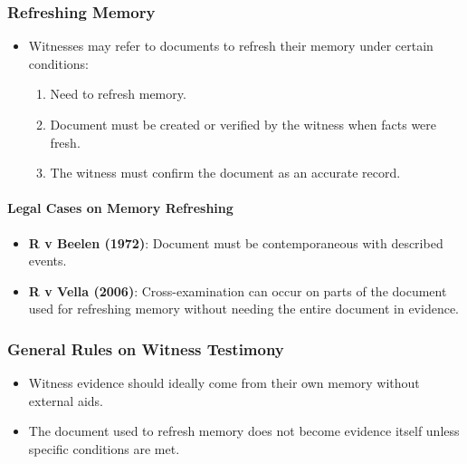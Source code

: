 \subsubsection{Refreshing Memory}\label{refreshing-memory}

\begin{itemize}
\tightlist
\item
  Witnesses may refer to documents to refresh their memory under certain
  conditions:

  \begin{enumerate}
  \def\labelenumi{\arabic{enumi}.}
  \tightlist
  \item
    Need to refresh memory.
  \item
    Document must be created or verified by the witness when facts were
    fresh.
  \item
    The witness must confirm the document as an accurate record.
  \end{enumerate}
\end{itemize}

\paragraph{Legal Cases on Memory
Refreshing}\label{legal-cases-on-memory-refreshing}

\begin{itemize}
\tightlist
\item
  \textbf{R v Beelen (1972)}: Document must be contemporaneous with
  described events.
\item
  \textbf{R v Vella (2006)}: Cross-examination can occur on parts of the
  document used for refreshing memory without needing the entire
  document in evidence.
\end{itemize}

\subsubsection{General Rules on Witness
Testimony}\label{general-rules-on-witness-testimony}

\begin{itemize}
\tightlist
\item
  Witness evidence should ideally come from their own memory without
  external aids.
\item
  The document used to refresh memory does not become evidence itself
  unless specific conditions are met.
\end{itemize}

